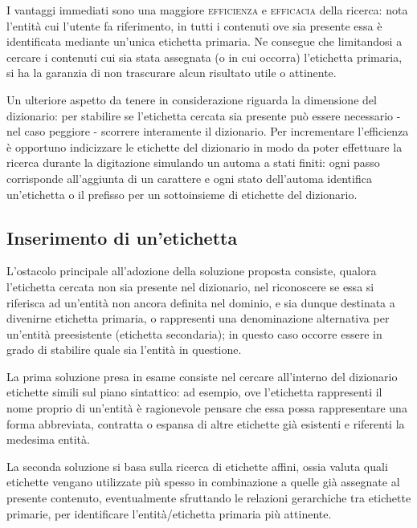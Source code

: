 \documentclass[10pt,a4paper,headinclude,footinclude,hidelinks]{scrreprt} %
\begin{document}
	I vantaggi immediati sono una maggiore \textsc{efficienza} e \textsc{efficacia} della ricerca: nota l'entità cui l'utente fa riferimento, in tutti i contenuti ove sia presente essa è identificata mediante un'unica etichetta primaria. Ne consegue che limitandosi a cercare i contenuti cui sia stata assegnata (o in cui occorra) l'etichetta primaria, si ha la garanzia di non trascurare alcun risultato utile o attinente.

	Un ulteriore aspetto da tenere in considerazione riguarda la dimensione del dizionario: per stabilire se l'etichetta cercata sia presente può essere necessario - nel caso peggiore - scorrere interamente il dizionario. Per incrementare l'efficienza è opportuno indicizzare le etichette del dizionario in modo da poter effettuare la ricerca durante la digitazione simulando un automa a stati finiti: ogni passo corrisponde all'aggiunta di un carattere e ogni stato dell'automa identifica un'etichetta o il prefisso per un sottoinsieme di etichette del dizionario.


	\subsection{Inserimento di un'etichetta}
	L'ostacolo principale all'adozione della soluzione proposta consiste, qualora l'etichetta cercata non sia presente nel dizionario, nel riconoscere se essa si riferisca ad un'entità non ancora definita nel dominio, e sia dunque destinata a divenirne etichetta primaria, o rappresenti una denominazione alternativa per un'entità preesistente (etichetta secondaria); in questo caso occorre essere in grado di stabilire quale sia l'entità in questione.

	La prima soluzione presa in esame consiste nel cercare all'interno del dizionario etichette simili sul piano sintattico: ad esempio, ove l'etichetta rappresenti il nome proprio di un'entità è ragionevole pensare che essa possa rappresentare una forma abbreviata, contratta o espansa di altre etichette già esistenti e riferenti la medesima entità. 

	La seconda soluzione si basa sulla ricerca di etichette affini, ossia valuta quali etichette vengano utilizzate più spesso in combinazione a quelle già assegnate al presente contenuto, eventualmente sfruttando le relazioni gerarchiche tra etichette primarie, per identificare l'entità/etichetta primaria più attinente.
\end{document}
